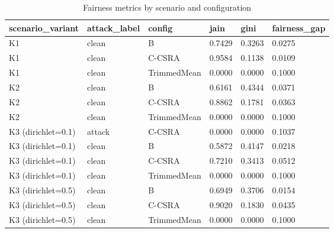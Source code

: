 \begin{table}[htbp]
\centering
\caption{Fairness metrics by scenario and configuration}
\label{tab:fairness}
\begin{tabular}{llllll}
\toprule
\textbf{scenario_variant} & \textbf{attack_label} & \textbf{config} & \textbf{jain} & \textbf{gini} & \textbf{fairness_gap} \\
\midrule
K1 & clean & B & 0.7429 & 0.3263 & 0.0275 \\
K1 & clean & C-CSRA & 0.9584 & 0.1138 & 0.0109 \\
K1 & clean & TrimmedMean & 0.0000 & 0.0000 & 0.1000 \\
K2 & clean & B & 0.6161 & 0.4344 & 0.0371 \\
K2 & clean & C-CSRA & 0.8862 & 0.1781 & 0.0363 \\
K2 & clean & TrimmedMean & 0.0000 & 0.0000 & 0.1000 \\
K3 (dirichlet=0.1) & attack & C-CSRA & 0.0000 & 0.0000 & 0.1037 \\
K3 (dirichlet=0.1) & clean & B & 0.5872 & 0.4147 & 0.0218 \\
K3 (dirichlet=0.1) & clean & C-CSRA & 0.7210 & 0.3413 & 0.0512 \\
K3 (dirichlet=0.1) & clean & TrimmedMean & 0.0000 & 0.0000 & 0.1000 \\
K3 (dirichlet=0.5) & clean & B & 0.6949 & 0.3706 & 0.0154 \\
K3 (dirichlet=0.5) & clean & C-CSRA & 0.9020 & 0.1830 & 0.0435 \\
K3 (dirichlet=0.5) & clean & TrimmedMean & 0.0000 & 0.0000 & 0.1000 \\
\bottomrule
\end{tabular}
\end{table}